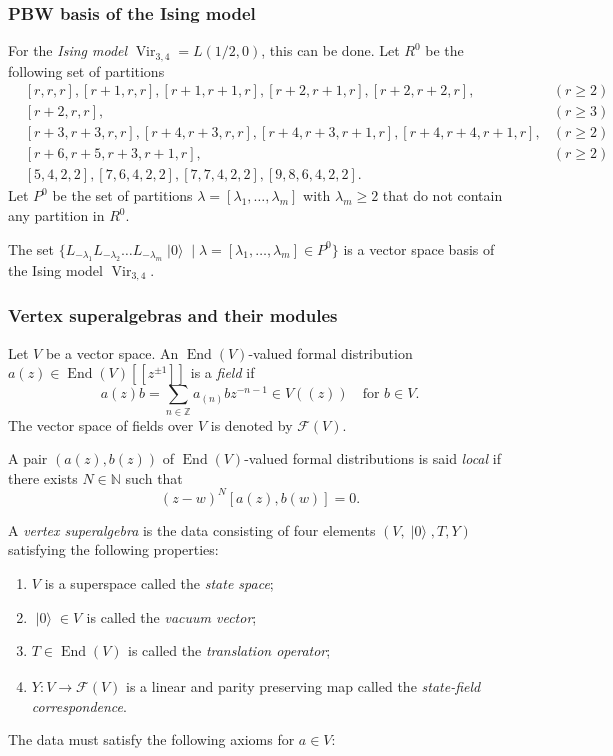 \documentclass{beamer}
\DeclareMathOperator{\Vir}{Vir}
\DeclareMathOperator{\End}{End}
\DeclareMathOperator{\vac}{|0\rangle}
\DeclareMathOperator{\zero}{\overline{0}}
\begin{document}
\begin{frame}
  \frametitle{PBW basis of the Ising model}
  For the \emph{Ising model} $\Vir_{3, 4} = L(1/2, 0)$, this can be done.
  Let $R^0$ be the following set of partitions
  \footnotesize
  \begin{align*}
    &[r, r, r], [r + 1, r, r], [r + 1, r + 1, r], [r + 2, r + 1, r], [r + 2, r + 2, r], &(r \ge 2) \\
    &[r + 2, r, r], &(r \ge 3) \\
    &[r + 3, r + 3, r, r], [r + 4, r + 3, r, r],  [r + 4, r + 3, r + 1, r], [r + 4, r + 4, r + 1, r], &(r \ge 2) \\
    &[r + 6, r + 5, r + 3, r + 1, r], &(r \ge 2) \\
    &[5, 4, 2, 2], [7, 6, 4, 2, 2], [7, 7, 4, 2, 2], [9, 8, 6, 4, 2, 2].
  \end{align*}
  \normalsize
  Let $P^0$ be the set of partitions $\lambda = [\lambda_1, \dots, \lambda_m]$ with $\lambda_m \ge 2$ that do not contain any partition in $R^0$.

  \begin{theorem}
    \label{thr:2}
    The set $\{L_{-\lambda_1}L_{-\lambda_2}\dots L_{-\lambda_m}\vac \mid \lambda = [\lambda_1, \dots, \lambda_m] \in P^0\}$ is a vector space basis of the Ising model $\Vir_{3, 4}$.
  \end{theorem}
\end{frame}

\begin{frame}
  \frametitle{Vertex superalgebras and their modules}
  Let $V$ be a vector space.
  An $\End(V)$-valued formal distribution $a(z) \in \End(V)[[z^{\pm 1}]]$ is a \emph{field} if
  \begin{equation*}
    a(z)b = \sum_{n \in \mathbb{Z}}a_{(n)}bz^{-n - 1} \in V((z)) \quad \text{for $b \in V$}.
  \end{equation*}
  The vector space of fields over $V$ is denoted by $\mathcal{F}(V)$.

  A pair $(a(z), b(z))$ of $\End(V)$-valued formal distributions is said \emph{local} if there exists $N \in \mathbb{N}$ such that
  \begin{equation*}
    (z - w)^N[a(z), b(w)] = 0.
  \end{equation*}
\end{frame}

\begin{frame}
  A \emph{vertex superalgebra} is the data consisting of four elements $(V, \vac, T, Y)$ satisfying the following properties:
  \begin{enumerate}
  \item $V$ is a superspace called the \emph{state space};
  \item $\vac \in V_{\zero}$ is called the \emph{vacuum vector};
  \item $T \in \End(V)_{\zero}$ is called the \emph{translation operator};
  \item $Y: V \to \mathcal{F}(V)$ is a linear and parity preserving map called the \emph{state-field correspondence}.
  \end{enumerate}
  The data must satisfy the following axioms for $a \in V$:
\end{frame}
\end{document}
